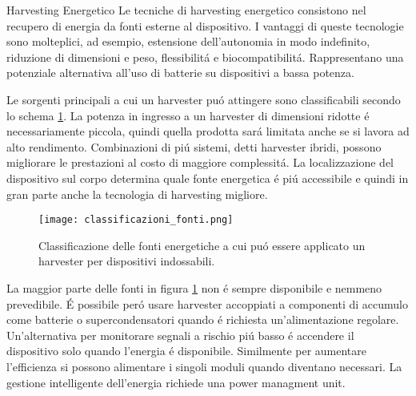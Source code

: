\begin{section}{Harvesting Energetico}
    Le tecniche di harvesting energetico consistono nel recupero di energia da fonti esterne al dispositivo. I vantaggi di queste tecnologie sono molteplici, ad esempio, estensione dell'autonomia in modo indefinito, riduzione di dimensioni e peso, flessibilit\'a e biocompatibilit\'a. Rappresentano una potenziale alternativa all'uso di batterie su dispositivi a bassa potenza.

    Le sorgenti principali a cui un harvester pu\'o attingere sono classificabili secondo lo schema \ref{fig:classificazione}. La potenza in ingresso a un harvester di dimensioni ridotte \'e necessariamente piccola, quindi quella prodotta sar\'a limitata anche se si lavora ad alto rendimento. Combinazioni di pi\'u sistemi, detti harvester ibridi, possono migliorare le prestazioni al costo di maggiore complessit\'a. La localizzazione del dispositivo sul corpo determina quale fonte energetica \'e pi\'u accessibile e quindi in gran parte anche la tecnologia di harvesting migliore.
    \begin{figure}[H]
        \texttt{[image: classificazioni\_fonti.png]}
        \centering
        \caption{Classificazione delle fonti energetiche a cui pu\'o essere applicato un harvester per dispositivi indossabili.}
        \label{fig:classificazione}
    \end{figure}
    
    La maggior parte delle fonti in figura \ref{fig:classificazione} non \'e sempre disponibile e nemmeno prevedibile. \'E possibile per\'o usare harvester accoppiati a componenti di accumulo come batterie o supercondensatori quando \'e richiesta un'alimentazione regolare. Un'alternativa per monitorare segnali a rischio pi\'u basso \'e accendere il dispositivo solo quando l'energia \'e disponibile. Similmente per aumentare l'efficienza si possono alimentare i singoli moduli quando diventano necessari. La gestione intelligente dell'energia richiede una power managment unit.
\end{section}


